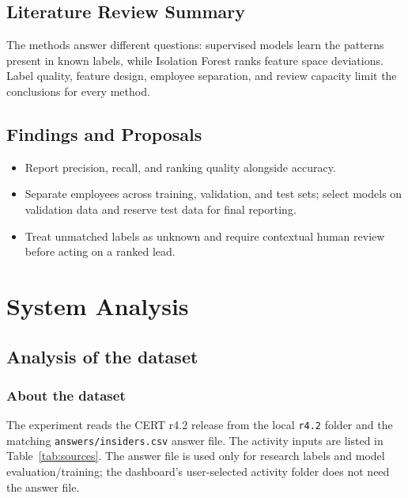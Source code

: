 \documentclass[12pt,a4paper,oneside]{report}
\begin{document}
\section{Literature Review Summary}
The methods answer different questions: supervised models learn the
patterns present in known labels, while Isolation Forest ranks feature
space deviations. Label quality, feature design, employee separation,
and review capacity limit the conclusions for every method.

\section{Findings and Proposals}
\begin{itemize}
  \item Report precision, recall, and ranking quality alongside accuracy.
  \item Separate employees across training, validation, and test sets;
        select models on validation data and reserve test data for final
        reporting.
  \item Treat unmatched labels as unknown and require contextual human
        review before acting on a ranked lead.
\end{itemize}

\chapter{System Analysis}
\section{Analysis of the dataset}
\subsection{About the dataset}
The experiment reads the CERT r4.2 release from the local \texttt{r4.2}
folder and the matching \texttt{answers/insiders.csv} answer file. The
activity inputs are listed in Table~\ref{tab:sources}. The answer file is
used only for research labels and model evaluation/training; the
dashboard's user-selected activity folder does not need the answer file.
\end{document}
